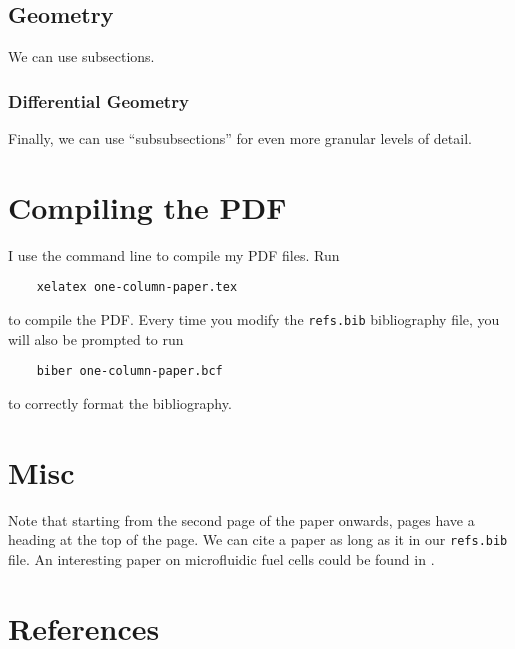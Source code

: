 \documentclass[10pt,notitlepage]{article}
\begin{document}
\subsection{Geometry}

We can use subsections.



%
%

\subsubsection{Differential Geometry}

Finally, we can use ``subsubsections'' for even more granular levels of detail.



%
%

\section{Compiling the PDF}

I use the command line to compile my PDF files.
Run
\begin{verbatim}
	xelatex one-column-paper.tex
\end{verbatim}
to compile the PDF.
Every time you modify the \verb+refs.bib+ bibliography file, you will also be prompted to run
\begin{verbatim}
	biber one-column-paper.bcf
\end{verbatim}
to correctly format the bibliography.



%
%

\section{Misc}

Note that starting from the second page of the paper onwards, pages have a heading at the top of the page.
We can cite a paper as long as it in our \verb+refs.bib+ file.
An interesting paper on microfluidic fuel cells could be found in \cite{vigolo-stone-rsc-2014}.




%
%

\newpage
\section*{References}
{\footnotesize \printbibliography[heading=none]}
\end{document}
